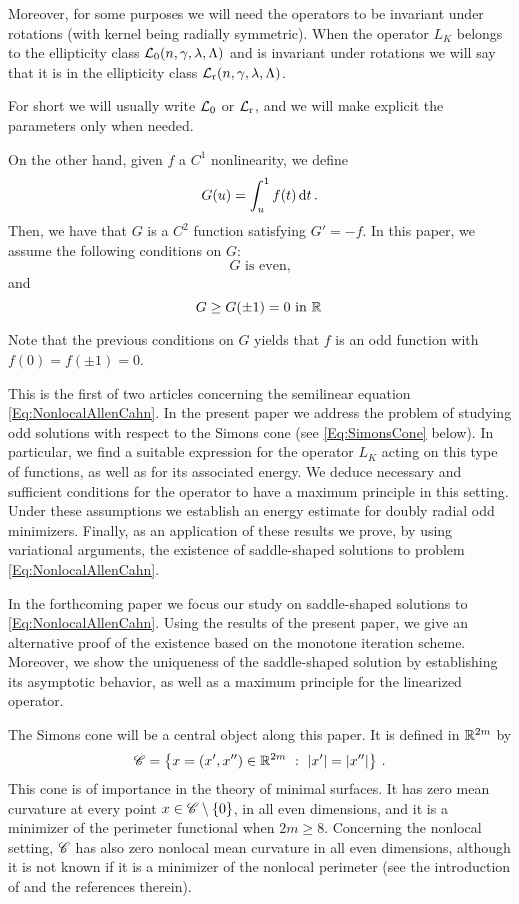 Moreover, for some purposes we will need the operators to be invariant under rotations (with kernel being radially symmetric). When the operator $L_K$ belongs to the ellipticity class $\mathcal{L}_0(n,\gamma,\lambda, \Lambda)$ and is invariant under rotations we will say that it is in the ellipticity class $\mathcal{L}_{\mathrm{r}}(n,\gamma,\lambda, \Lambda)$.


For short we will usually write $\mathcal{L}_0$ or $\mathcal{L}_{\mathrm{r}}$, and we will make explicit the parameters only when needed.

On the other hand, given $f$ a $C^1$ nonlinearity, we define
$$
G(u)= \int_u^1 f(t) \,\mathrm{d} t\,.
$$
Then, we have that $G$ is a $C^2$ function satisfying $G' = -f$. In this paper, we assume the following conditions on $G$:
\begin{equation}
\label{Eq:HipothesisfOdd}
G \textrm{ is even,}
\end{equation}
and
\begin{equation}
\label{Eq:HipothesisGWells}
G\geq G(\pm 1 )=0 \textrm{ in } \mathbb{R}\,
\end{equation}

Note that the previous conditions on $G$ yields that $f$ is an odd function with $f(0)=f(\pm 1)=0$.

This is the first of two articles concerning the semilinear equation \eqref{Eq:NonlocalAllenCahn}. In the present paper we address the problem of studying odd solutions with respect to the Simons cone (see \eqref{Eq:SimonsCone} below). In particular, we find a suitable expression for the operator $L_K$  acting on this type of functions, as well as for its associated energy. We deduce necessary and sufficient conditions for the operator to have a maximum principle in this setting. Under these assumptions we establish an energy estimate for doubly radial odd minimizers. Finally, as an application of these results we prove, by using variational arguments, the existence of saddle-shaped solutions to problem \eqref{Eq:NonlocalAllenCahn}.

In the forthcoming paper \cite{FelipeSanz-Perela:IntegroDifferentialII} we focus our study on saddle-shaped solutions to \eqref{Eq:NonlocalAllenCahn}. Using the results of the present paper, we give an alternative proof of the existence based on the monotone iteration scheme. Moreover, we show the uniqueness of the saddle-shaped solution by establishing its asymptotic behavior, as well as a maximum principle for the linearized operator.

The Simons cone will be a central object along this paper. It is defined in $\mathbb{R}^{2m}$ by
\begin{equation}
\label{Eq:SimonsCone}
\mathscr{C} = \left \{ x = (x', x'') \in \mathbb{R}^{2m} \ : \ |x'| = |x''| \right \}\,.
\end{equation}
This cone is of importance in the theory of minimal surfaces. It has zero mean curvature at every point $x\in \mathscr{C} \setminus \{0\}$, in all even dimensions, and it is a minimizer of the perimeter functional when $2m\geq 8$. Concerning the nonlocal setting, $\mathscr{C}$ has also zero nonlocal mean curvature in all even dimensions, although it is not known if it is a minimizer of the nonlocal perimeter (see the introduction of \cite{Felipe-Sanz-Perela:SaddleFractional} and the references therein).

